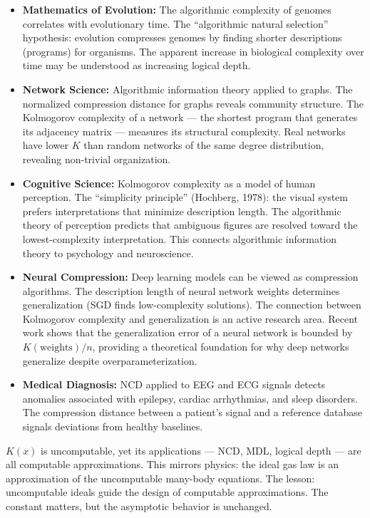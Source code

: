 \begin{itemize}
\item \textbf{Mathematics of Evolution:} The algorithmic complexity of genomes correlates with evolutionary time. The ``algorithmic natural selection'' hypothesis: evolution compresses genomes by finding shorter descriptions (programs) for organisms. The apparent increase in biological complexity over time may be understood as increasing logical depth.

\item \textbf{Network Science:} Algorithmic information theory applied to graphs. The normalized compression distance for graphs reveals community structure. The Kolmogorov complexity of a network --- the shortest program that generates its adjacency matrix --- measures its structural complexity. Real networks have lower $K$ than random networks of the same degree distribution, revealing non-trivial organization.

\item \textbf{Cognitive Science:} Kolmogorov complexity as a model of human perception. The ``simplicity principle'' (Hochberg, 1978): the visual system prefers interpretations that minimize description length. The algorithmic theory of perception predicts that ambiguous figures are resolved toward the lowest-complexity interpretation. This connects algorithmic information theory to psychology and neuroscience.

\item \textbf{Neural Compression:} Deep learning models can be viewed as compression algorithms. The description length of neural network weights determines generalization (SGD finds low-complexity solutions). The connection between Kolmogorov complexity and generalization is an active research area. Recent work shows that the generalization error of a neural network is bounded by $K(\text{weights}) / n$, providing a theoretical foundation for why deep networks generalize despite overparameterization.

\item \textbf{Medical Diagnosis:} NCD applied to EEG and ECG signals detects anomalies associated with epilepsy, cardiac arrhythmias, and sleep disorders. The compression distance between a patient's signal and a reference database signals deviations from healthy baselines.
\end{itemize}

$K(x)$ is uncomputable, yet its applications --- NCD, MDL, logical depth --- are all computable approximations. This mirrors physics: the ideal gas law is an approximation of the uncomputable many-body equations. The lesson: uncomputable ideals guide the design of computable approximations. The constant matters, but the asymptotic behavior is unchanged.

